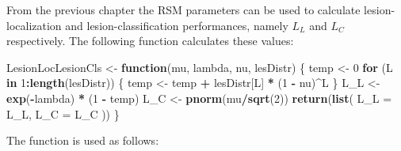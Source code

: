 \documentclass[
]{book}
\newenvironment{Shaded}{\begin{snugshade}}{\end{snugshade}}
\newcommand{\ControlFlowTok}[1]{\textcolor[rgb]{0.13,0.29,0.53}{\textbf{#1}}}
\newcommand{\DataTypeTok}[1]{\textcolor[rgb]{0.13,0.29,0.53}{#1}}
\newcommand{\DecValTok}[1]{\textcolor[rgb]{0.00,0.00,0.81}{#1}}
\newcommand{\KeywordTok}[1]{\textcolor[rgb]{0.13,0.29,0.53}{\textbf{#1}}}
\newcommand{\NormalTok}[1]{#1}
\newcommand{\OperatorTok}[1]{\textcolor[rgb]{0.81,0.36,0.00}{\textbf{#1}}}
\newcommand{\StringTok}[1]{\textcolor[rgb]{0.31,0.60,0.02}{#1}}
\begin{document}
From the previous chapter the RSM parameters can be used to calculate lesion-localization and lesion-classification performances, namely \(L_L\) and \(L_C\) respectively. The following function calculates these values:

\begin{Shaded}
\begin{Highlighting}[]
\NormalTok{LesionLocLesionCls <-}\StringTok{ }\ControlFlowTok{function}\NormalTok{(mu, lambda, nu, lesDistr) \{}
\NormalTok{  temp <-}\StringTok{ }\DecValTok{0}
  \ControlFlowTok{for}\NormalTok{ (L }\ControlFlowTok{in} \DecValTok{1}\OperatorTok{:}\KeywordTok{length}\NormalTok{(lesDistr)) \{}
\NormalTok{    temp <-}\StringTok{ }\NormalTok{temp }\OperatorTok{+}\StringTok{ }\NormalTok{lesDistr[L] }\OperatorTok{*}\StringTok{ }\NormalTok{(}\DecValTok{1} \OperatorTok{-}\StringTok{ }\NormalTok{nu)}\OperatorTok{^}\NormalTok{L}
\NormalTok{  \}}
\NormalTok{  L_L <-}\StringTok{ }\KeywordTok{exp}\NormalTok{(}\OperatorTok{-}\NormalTok{lambda) }\OperatorTok{*}\StringTok{ }\NormalTok{(}\DecValTok{1} \OperatorTok{-}\StringTok{ }\NormalTok{temp)}
\NormalTok{  L_C <-}\StringTok{ }\KeywordTok{pnorm}\NormalTok{(mu}\OperatorTok{/}\KeywordTok{sqrt}\NormalTok{(}\DecValTok{2}\NormalTok{))}
  \KeywordTok{return}\NormalTok{(}\KeywordTok{list}\NormalTok{(}
    \DataTypeTok{L_L =}\NormalTok{ L_L,}
    \DataTypeTok{L_C =}\NormalTok{ L_C}
\NormalTok{  ))}
\NormalTok{\}}
\end{Highlighting}
\end{Shaded}

The function is used as follows:
\end{document}
